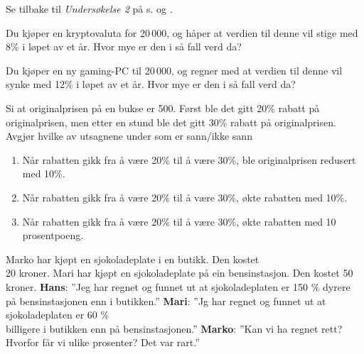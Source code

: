 Se tilbake til \textsl{Undersøkelse 2} på s. \pageref{undersok} og \pageref{sektorund2}. 

 \vs
{}

 \vs
{}
Du kjøper en kryptovaluta for 20\,000, og håper at verdien til denne vil stige med 8\% i løpet av et år. Hvor mye er den i så fall verd da?

Du kjøper en ny gaming-PC til 20\,000, og regner med at verdien til denne vil synke med 12\% i løpet av et år. Hvor mye er den i så fall verd da?

Si at originalprisen på en bukse er 500. Først ble det gitt 20\% rabatt på originalprisen, men etter en stund ble det gitt 30\% rabatt på originalprisen. Avgjør hvilke av utsagnene under som er sann/ikke sann
\begin{enumerate}[label=(\roman*)]
	\item Når rabatten gikk fra å være 20\% til å være 30\%, ble originalprisen redusert med 10\%.
	\item Når rabatten gikk fra å være 20\% til å være 30\%, økte rabatten med 10\%.
	\item Når rabatten gikk fra å være 20\% til å være 30\%, økte rabatten med 10 prosentpoeng.	
\end{enumerate}

Marko har kjøpt en sjokoladeplate i en butikk. Den kostet\\ 20 kroner.\os
Mari har kjøpt en sjokoladeplate på ein bensinstasjon. Den kostet 50 kroner.\os
\textbf{Hans}: 
''Jeg har regnet og funnet ut at sjokoladeplaten er
150 \% dyrere på bensinstasjonen enn i butikken.''\os
\textbf{Mari}: ''Jg har regnet og funnet ut at sjokoladeplaten er 
60 \% \\ billigere i butikken enn på bensinstasjonen.''\os
\textbf{Marko}: ''Kan vi ha regnet rett? Hvorfor får vi ulike prosenter? Det var rart.'' \os

